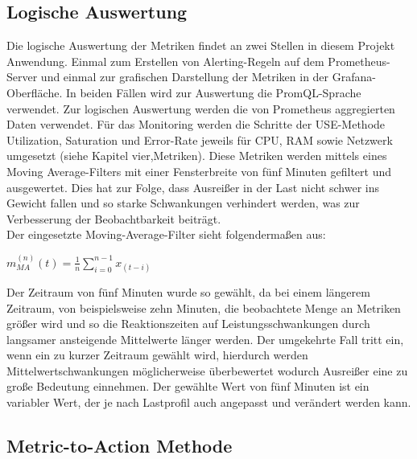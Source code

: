 \documentclass[a4paper,10pt]{scrartcl}
\begin{document}
\subsection{Logische Auswertung}

Die logische Auswertung der Metriken findet an zwei Stellen in diesem Projekt Anwendung. Einmal zum Erstellen von Alerting-Regeln auf dem Prometheus-Server und einmal zur grafischen Darstellung der Metriken in der Grafana-Oberfläche. In beiden Fällen wird zur Auswertung die PromQL-Sprache verwendet.
Zur logischen Auswertung werden die von Prometheus aggregierten Daten verwendet. Für das Monitoring werden die Schritte der USE-Methode Utilization, Saturation und Error-Rate jeweils für CPU, RAM sowie Netzwerk umgesetzt (siehe Kapitel vier,Metriken). Diese Metriken werden mittels eines \glqq Moving Average\grqq-Filters mit einer Fensterbreite von fünf Minuten gefiltert und ausgewertet. Dies hat zur Folge, dass Ausreißer in der Last nicht schwer ins Gewicht fallen und so starke Schwankungen verhindert werden, was zur Verbesserung der Beobachtbarkeit beiträgt.\\
Der eingesetzte \glqq Moving-Average\grqq-Filter sieht folgendermaßen aus:\\

\begin{Huge}

\(
\displaystyle{m^{(n)}_{MA}(t) = \frac{1}{n}{\sum\limits_{i=0}^{{n-1}} x_{(t-i)}} }
\)\\

\end{Huge}

Der Zeitraum von fünf Minuten wurde so gewählt, da bei einem längerem Zeitraum, von beispielsweise zehn Minuten, die beobachtete Menge an Metriken größer wird und so die Reaktionszeiten auf Leistungsschwankungen durch langsamer ansteigende Mittelwerte länger werden.
Der umgekehrte Fall tritt ein, wenn ein zu kurzer Zeitraum gewählt wird, hierdurch werden Mittelwertschwankungen möglicherweise überbewertet wodurch Ausreißer eine zu große Bedeutung einnehmen.
Der gewählte Wert von fünf Minuten ist ein variabler Wert, der je nach Lastprofil auch angepasst und verändert werden kann.

\subsection{Metric-to-Action Methode}
\end{document}
